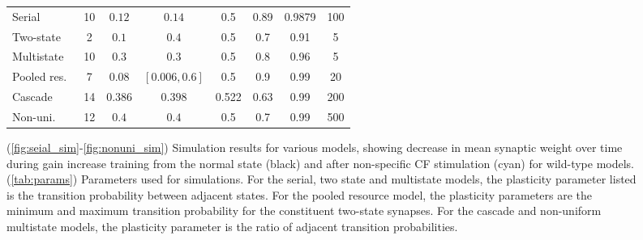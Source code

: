 \documentclass[10pt]{article}
\begin{document}
\begin{figure}[p]
\begin{myenuma}
{\begin{tabular}{|l|c|c|c|c|c|c|c|}
    \cline{1-8}
    Serial       & 10 & $0.12$  & $0.14$        & 0.5   & 0.89 & 0.9879 & 100 \\
    Two-state    & 2  & $0.1$   & $0.4$         & 0.5   & 0.7  & 0.91   & 5   \\
    Multistate   & 10 & $0.3$   & $0.3$         & 0.5   & 0.8  & 0.96   & 5   \\
    Pooled res.\ & 7  & $0.08$  & $[0.006,0.6]$ & 0.5   & 0.9  & 0.99   & 20  \\
    Cascade      & 14 & $0.386$ & $0.398$       & 0.522 & 0.63 & 0.99   & 200  \\
    Non-uni.\    & 12 & $0.4$   & $0.4$         & 0.5   & 0.7  & 0.99   & 500  \\
    \cline{1-8}
  \end{tabular}}
  \end{myenuma}
  \caption[Simulation results for various models]{(\ref{fig:seial_sim}-\ref{fig:nonuni_sim}) Simulation results for various models, showing decrease in mean synaptic weight over time during gain increase training from the normal state (black) and after non-specific CF stimulation (cyan) for wild-type models.
  (\ref{tab:params}) Parameters used for simulations.
  For the serial, two state and multistate models, the plasticity parameter listed is the transition probability between adjacent states.
  For the pooled resource model, the plasticity parameters are the minimum and maximum transition probability for the constituent two-state synapses.
  For the cascade and non-uniform multistate models, the plasticity parameter is the ratio of adjacent transition probabilities.}\label{fig:sim_ChR2}
\end{figure}








\end{document}
